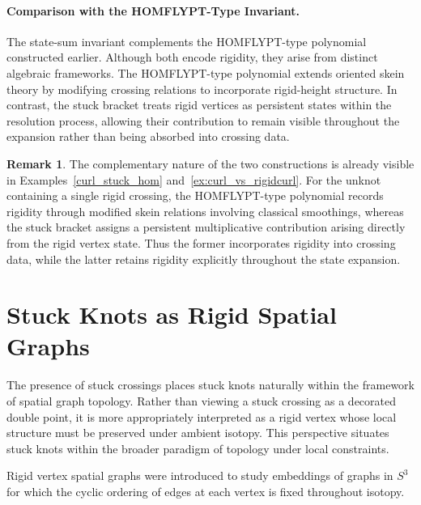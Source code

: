 \documentclass[11pt,a4paper]{article}
\theoremstyle{plain}
\theoremstyle{definition}
\newtheorem{remark}[theorem]{Remark}
\begin{document}
\paragraph{Comparison with the HOMFLYPT-Type Invariant.}

The state-sum invariant complements the HOMFLYPT-type polynomial constructed earlier. Although both encode rigidity, they arise from distinct algebraic frameworks. The HOMFLYPT-type polynomial extends oriented skein theory by modifying crossing relations to incorporate rigid-height structure. In contrast, the stuck bracket treats rigid vertices as persistent states within the resolution process, allowing their contribution to remain visible throughout the expansion rather than being absorbed into crossing data.

\begin{remark}
The complementary nature of the two constructions is already visible 
in Examples~\ref{curl_stuck_hom} and~\ref{ex:curl_vs_rigidcurl}. 
For the unknot containing a single rigid crossing, the HOMFLYPT-type 
polynomial records rigidity through modified skein relations involving 
classical smoothings, whereas the stuck bracket assigns a persistent 
multiplicative contribution arising directly from the rigid vertex state. 
Thus the former incorporates rigidity into crossing data, while the latter retains rigidity explicitly throughout the state expansion.
\end{remark}





\section{Stuck Knots as Rigid Spatial Graphs}\label{sec:SpatialGraphs}

The presence of stuck crossings places stuck knots naturally within the framework of spatial graph topology. Rather than viewing a stuck crossing as a decorated double point, it is more appropriately interpreted as a rigid vertex whose local structure must be preserved under ambient isotopy. This perspective situates stuck knots within the broader paradigm of topology under local constraints.

Rigid vertex spatial graphs were introduced to study embeddings of graphs in $S^3$ for which the cyclic ordering of edges at each vertex is fixed throughout isotopy.
\end{document}
